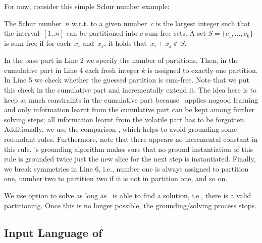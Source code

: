 \begin{example}
For now, consider this simple Schur number example:

%
The Schur number~$n$ w.r.t. to a given number~$c$ is the largest integer 
such that the interval~$[1..n]$ can be partitioned into $c$ sum-free sets.
A set $S=\{c_1 ,\dots, c_k\}$ is sum-free if for each~$x_i$ and~$x_j$, 
it holds that~$x_i + x_j \not \in S$.

In the base part in Line 2 we specify the number of partitions.
Then, in the cumulative part in Line 4 each fresh integer $k$
is assigned to exactly one partition.
In Line 5 we check whether the guessed partition is sum-free.
Note that we put this check in the cumulative part and incrementally extend it.
The idea here is to keep as much constraints in the cumulative part
because \clasp\ applies nogood learning and only information learnt from 
the cumulative part can be kept among further solving steps;
all information learnt from the volatile part has to be forgotten.
Additionally, we use the comparison  , 
which helps to avoid grounding some redundant rules.
Furthermore, note that there appears no incremental constant in this rule,
\gringo's grounding algorithm makes sure that no ground instantiation of this rule 
is grounded twice just the new slice for the next step is instantiated.
Finally, we break symmetries in Line 6, i.e.,
number one is always assigned to partition one, number two to partition two 
if it is not in partition one, and so on. 

We use option  to solve as long as 
\iclingo\ is able to find a solution, i.e., there is a 
valid partitioning. Once this is no longer possible, the grounding/solving 
process stops.\eexample
\end{example}

\subsection{Input Language of \clasp}\label{subsec:lang:clasp}

